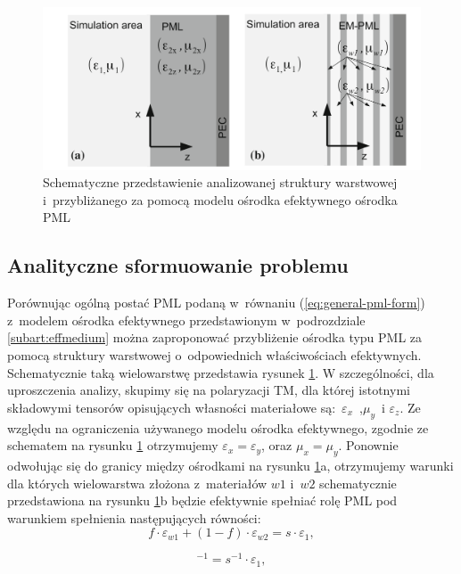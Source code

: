 \begin{figure}[tb]
	\includegraphics[width=\textwidth]{images/pml/oqe_schemat.png}
	\caption{Schematyczne przedstawienie analizowanej struktury warstwowej i~przybliżanego za pomocą modelu ośrodka efektywnego ośrodka PML}
	\label{fig:pml-multilay-schem}
\end{figure}

\subsection{Analityczne sformuowanie problemu}
Porównując ogólną postać PML podaną w~równaniu (\ref{eq:general-pml-form}) z~modelem ośrodka efektywnego przedstawionym w~podrozdziale \ref{subart:effmedium} można zaproponować przybliżenie ośrodka typu PML za pomocą struktury warstwowej o~odpowiednich właściwościach efektywnych. Schematycznie taką wielowarstwę przedstawia rysunek \ref{fig:pml-multilay-schem}. W szczególności, dla uproszczenia analizy, skupimy się na polaryzacji TM, dla której istotnymi składowymi tensorów opisujących własności materiałowe są:~$\varepsilon_x$~,$\mu_y$~i $\varepsilon_z$. Ze względu na ograniczenia używanego modelu ośrodka efektywnego, zgodnie ze schematem na rysunku \ref{fig:pml-multilay-schem} otrzymujemy $\varepsilon_x=\varepsilon_y$, oraz $\mu_x=\mu_y$. Ponownie odwołując się do granicy między ośrodkami na rysunku \ref{fig:pml-multilay-schem}a, otrzymujemy warunki dla których wielowarstwa złożona z~materiałów $w1$ i~$w2$ schematycznie przedstawiona na rysunku \ref{fig:pml-multilay-schem}b będzie efektywnie spełniać rolę PML pod warunkiem spełnienia następujących równości:
\begin{equation}
	f\cdot \varepsilon_{w1} + (1-f)\cdot \varepsilon_{w2} = s \cdot \varepsilon_1,
	\label{eq:oqe4}
\end{equation}

\begin{equation}
	[f\cdot \varepsilon_{w1}^{-1}+(1-f)\varepsilon_{w2}^{-1}]^{-1}=s^{-1}\cdot \varepsilon_1,
	\label{eq:oqe5}
\end{equation}

